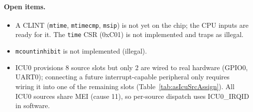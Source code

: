\paragraph{Open items.}
\begin{itemize}
  \item A CLINT (\texttt{mtime}, \texttt{mtimecmp}, \texttt{msip}) is not
    yet on the chip; the CPU inputs are ready for it. The \texttt{time}
    CSR (0xC01) is not implemented and traps as illegal.
  \item \texttt{mcountinhibit} is not implemented (illegal).
  \item ICU0 provisions 8 source slots but only 2 are wired to real
    hardware (GPIO0, UART0); connecting a future interrupt-capable peripheral only requires
    wiring it into one of the remaining slots
    (Table~\ref{tab:asIcuSrcAssign}). All ICU0 sources share MEI
    (cause 11), so per-source dispatch uses ICU0\_IRQID in software.
\end{itemize}
